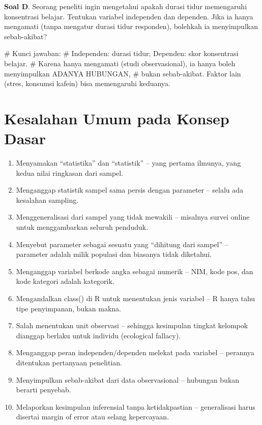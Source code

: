 \documentclass[
  indonesian,
  letterpaper,
]{book}
\newenvironment{Shaded}{\begin{snugshade}}{\end{snugshade}}
\newcommand{\CommentTok}[1]{\textcolor[rgb]{0.37,0.37,0.37}{#1}}
\providecommand{\tightlist}{%
  \setlength{\itemsep}{0pt}\setlength{\parskip}{0pt}}
\begin{document}
\textbf{Soal D}. Seorang peneliti ingin mengetahui apakah durasi tidur
memengaruhi konsentrasi belajar. Tentukan variabel independen dan
dependen. Jika ia hanya mengamati (tanpa mengatur durasi tidur
responden), bolehkah ia menyimpulkan sebab-akibat?

\begin{Shaded}
\begin{Highlighting}[]
\CommentTok{\# Kunci jawaban:}
\CommentTok{\# Independen: durasi tidur; Dependen: skor konsentrasi belajar.}
\CommentTok{\# Karena hanya mengamati (studi observasional), ia hanya boleh menyimpulkan ADANYA HUBUNGAN,}
\CommentTok{\# bukan sebab{-}akibat. Faktor lain (stres, konsumsi kafein) bisa memengaruhi keduanya.}
\end{Highlighting}
\end{Shaded}

\section{Kesalahan Umum pada Konsep
Dasar}\label{kesalahan-umum-pada-konsep-dasar}

\begin{enumerate}
\def\labelenumi{\arabic{enumi}.}
\tightlist
\item
  Menyamakan ``statistika'' dan ``statistik'' -- yang pertama ilmunya,
  yang kedua nilai ringkasan dari sampel.
\item
  Menganggap statistik sampel sama persis dengan parameter -- selalu ada
  kesalahan sampling.
\item
  Menggeneralisasi dari sampel yang tidak mewakili -- misalnya survei
  online untuk menggambarkan seluruh penduduk.
\item
  Menyebut parameter sebagai sesuatu yang ``dihitung dari sampel'' --
  parameter adalah milik populasi dan biasanya tidak diketahui.
\item
  Menganggap variabel berkode angka sebagai numerik -- NIM, kode pos,
  dan kode kategori adalah kategorik.
\item
  Mengandalkan class() di R untuk menentukan jenis variabel -- R hanya
  tahu tipe penyimpanan, bukan makna.
\item
  Salah menentukan unit observasi -- sehingga kesimpulan tingkat
  kelompok dianggap berlaku untuk individu (ecological fallacy).
\item
  Menganggap peran independen/dependen melekat pada variabel -- perannya
  ditentukan pertanyaan penelitian.
\item
  Menyimpulkan sebab-akibat dari data observasional -- hubungan bukan
  berarti penyebab.
\item
  Melaporkan kesimpulan inferensial tanpa ketidakpastian -- generalisasi
  harus disertai margin of error atau selang kepercayaan.
\end{enumerate}
\end{document}
